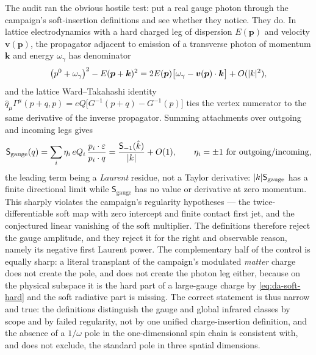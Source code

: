 \begin{observation}
\label{obs:da-weinberg-control}
The audit ran the obvious hostile test: put a real gauge photon through the
campaign's soft-insertion definitions and see whether they notice. They do.
In lattice electrodynamics with a hard charged leg of dispersion $E(\bm p)$ and
velocity $\bm v(\bm p)$, the propagator adjacent to emission of a transverse
photon of momentum $\bm k$ and energy $\omega_\gamma$ has denominator
\begin{equation}
  \bigl(p^0+\omega_\gamma\bigr)^2-E(\bm p+\bm k)^2
  =2E(\bm p)\bigl[\omega_\gamma-\bm v(\bm p)\cdot\bm k\bigr]+O(\lvert k\rvert^2),
  \label{eq:da-adjacent-prop}
\end{equation}
and the lattice Ward--Takahashi identity
$\widehat q_\mu\Gamma^\mu(p+q,p)=eQ\bigl[G^{-1}(p+q)-G^{-1}(p)\bigr]$ ties the
vertex numerator to the same derivative of the inverse propagator. Summing
attachments over outgoing and incoming legs gives
\begin{equation}
  \mathsf S_{\mathrm{gauge}}(q)
  =\sum_i\eta_i\,eQ_i\,\frac{p_i\cdot\varepsilon}{p_i\cdot q}
  =\frac{\mathsf S_{-1}(\hat k)}{\lvert k\rvert}+O(1),
  \qquad \eta_i=\pm1\ \text{for outgoing/incoming},
  \label{eq:da-weinberg}
\end{equation}
the leading term being a \emph{Laurent} residue, not a Taylor derivative:
$\lvert k\rvert\mathsf S_{\mathrm{gauge}}$ has a finite directional limit while
$\mathsf S_{\mathrm{gauge}}$ has no value or derivative at zero momentum. This
sharply violates the campaign's regularity hypotheses --- the twice-differentiable
soft map with zero intercept and finite contact first jet, and the conjectured
linear vanishing of the soft multiplier. The definitions therefore reject the
gauge amplitude, and they reject it for the right and observable reason, namely
its negative first Laurent power. The complementary half of the control is
equally sharp: a literal transplant of the campaign's modulated \emph{matter}
charge does not create the pole, and does not create the photon leg either,
because on the physical subspace it is the hard part of a large-gauge charge by
\eqref{eq:da-soft-hard} and the soft radiative part is missing. The correct
statement is thus narrow and true: the definitions distinguish the gauge and
global infrared classes by scope and by failed regularity, not by one unified
charge-insertion definition, and the absence of a $1/\omega$ pole in the
one-dimensional spin chain is consistent with, and does not exclude, the
standard pole in three spatial dimensions.
\end{observation}

